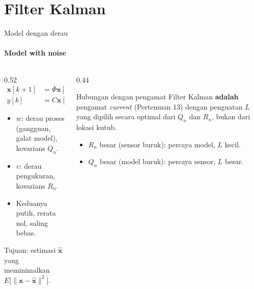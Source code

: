 \documentclass[aspectratio=169,10pt]{beamer}
\begin{document}
\section{Filter Kalman\texorpdfstring{\\[4pt]{\Large{}}}{ / The Kalman Filter}}

\begin{frame}{Model dengan derau}
	\framesubtitle{Model with noise}
	\begin{columns}[T]
		\begin{column}{0.52\textwidth}
			\small
			\begin{align*}
				\mathbf{x}[k+1] &= \Phi\mathbf{x}[k] + \Gamma u[k] + \Gamma_w w[k]\\
				y[k] &= C\mathbf{x}[k] + v[k]
			\end{align*}
			\begin{itemize}
				\item $w$: derau proses (gangguan, galat model), kovarians $Q_n$.
				\item $v$: derau pengukuran, kovarians $R_n$.
				\item Keduanya putih, rerata nol, saling bebas.
			\end{itemize}
			Tujuan: estimasi $\hat{\mathbf{x}}$ yang meminimalkan $E\big[\|\mathbf{x} - \hat{\mathbf{x}}\|^2\big]$.
		\end{column}
		\begin{column}{0.44\textwidth}
			\begin{block}{Hubungan dengan pengamat}
				\small
				Filter Kalman \textbf{adalah} pengamat \textit{current} (Pertemuan 13) dengan penguatan $L$ yang dipilih secara optimal dari $Q_n$ dan $R_n$, bukan dari lokasi kutub.
			\end{block}
			\small
			\begin{itemize}
				\item $R_n$ besar (sensor buruk): percaya model, $L$ kecil.
				\item $Q_n$ besar (model buruk): percaya sensor, $L$ besar.
			\end{itemize}
		\end{column}
	\end{columns}
\end{frame}
\end{document}
